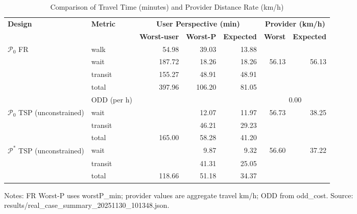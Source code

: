 \begin{table}[t]
\centering
\caption{Comparison of Travel Time (minutes) and Provider Distance Rate (km/h)}
\begin{tabular}{l l r r r r r}
\toprule
\textbf{Design} & \textbf{Metric} & 
\multicolumn{3}{c}{\textbf{User Perspective (min)}} & 
\multicolumn{2}{c}{\textbf{Provider (km/h)}} \\
\cmidrule(lr){3-5}\cmidrule(lr){6-7}
& & \textbf{Worst-user} & \textbf{Worst-P} & \textbf{Expected} & \textbf{Worst} & \textbf{Expected} \\
\midrule
$\mathcal{P}_0$ FR & walk    & 54.98 & 39.03 & 13.88 &        &        \\
                   & wait    & 187.72 & 18.26 & 18.26 & 56.13  & 56.13  \\
                   & transit & 155.27 & 48.91 & 48.91 &        &        \\
                   & total   & 397.96 & 106.20 & 81.05 &       &        \\
                   & ODD (per h) &  &  &  & \multicolumn{2}{c}{0.00} \\
\midrule
$\mathcal{P}_0$ TSP (unconstrained) & wait    &  & 12.07 & 11.97 & 56.73 & 38.25 \\
                                    & transit &  & 46.21 & 29.23 &        &       \\
                                    & total   & 165.00 & 58.28 & 41.20 &        &       \\
\midrule
$\mathcal{P}^*$ TSP (unconstrained) & wait    &  & 9.87 & 9.32 & 56.60 & 37.22 \\
                                    & transit &  & 41.31 & 25.05 &        &       \\
                                    & total   & 118.66 & 51.18 & 34.37 &        &       \\
\bottomrule
\end{tabular}

\vspace{0.5ex}
\small
Notes: FR Worst-P uses worstP\_min; provider values are aggregate travel km/h; ODD from odd\_cost. Source: results/real_case_summary_20251130_101348.json.
\end{table}
